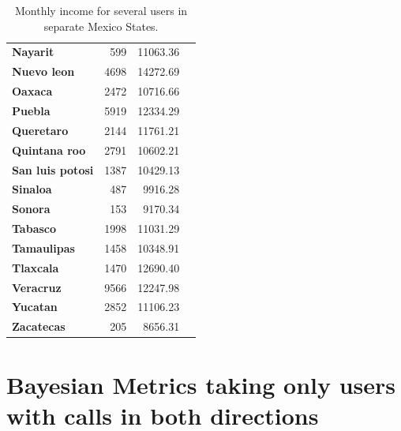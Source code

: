 \begin{table}[!h]
\begin{tabular}{>{\bfseries}l r r c}
Nayarit & \num{599} & \num{11063.36} & \\
Nuevo leon & \num{4698} & \num{14272.69} & \\
Oaxaca & \num{2472} & \num{10716.66} & \\
Puebla & \num{5919} & \num{12334.29} & \\
Queretaro & \num{2144} & \num{11761.21} & \\
Quintana roo & \num{2791} & \num{10602.21} & \\
San luis potosi & \num{1387} & \num{10429.13} & \\
Sinaloa & \num{487} & \num{9916.28} & \\
Sonora & \num{153} & \num{9170.34} & \\
Tabasco & \num{1998} & \num{11031.29} & \\
Tamaulipas & \num{1458} & \num{10348.91} & \\
Tlaxcala & \num{1470} & \num{12690.40} & \\
Veracruz & \num{9566} & \num{12247.98} & \\
Yucatan & \num{2852} & \num{11106.23} & \\
Zacatecas & \num{205} & \num{8656.31} & \\
\bottomrule
\end{tabular}
\caption{Monthly income for several users in separate Mexico States.}
\label{tab:regions}
\end{table}

\newpage

\section{Bayesian Metrics taking only users with calls in both directions}
\setcounter{topnumber}{8}
\setcounter{bottomnumber}{8}
\setcounter{totalnumber}{8}

